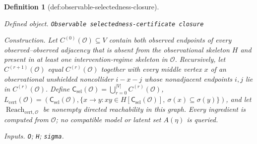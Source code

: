 \documentclass{article}
\newtheorem{definition}{Definition}
\begin{document}
\begin{definition}[def:observable-selectedness-closure]\label{def:observable-selectedness-closure}
\par\smallskip\noindent\emph{Defined object.} \texttt{Observable selectedness-\allowbreak{}certificate closure}
\par\smallskip\noindent\emph{Construction.} Let \(C^{(0)}(\mathcal O)\subseteq V\) contain both observed endpoints of every observed--observed adjacency that is absent from the observational skeleton \(H\) and present in at least one intervention-regime skeleton in \(\mathcal O\). Recursively, let \(C^{(r+1)}(\mathcal O)\) equal \(C^{(r)}(\mathcal O)\) together with every middle vertex \(x\) of an observational unshielded noncollider \(i-x-j\) whose nonadjacent endpoints \(i,j\) lie in \(C^{(r)}(\mathcal O)\). Define \(\mathsf C_{\mathrm{sel}}(\mathcal O)=\bigcup_{r=0}^{|V|}C^{(r)}(\mathcal O)\), \(L_{\mathrm{cert}}(\mathcal O)=(\mathsf C_{\mathrm{sel}}(\mathcal O),\{x\to y:xy\in H[\mathsf C_{\mathrm{sel}}(\mathcal O)],\ \sigma(x)\subseteq\sigma(y)\})\), and let \(\operatorname{Reach}_{\mathrm{cert},\mathcal O}\) be nonempty directed reachability in this graph. Every ingredient is computed from \(\mathcal O\); no compatible model or latent set \(A(\eta)\) is queried.
\par\smallskip\noindent\emph{Inputs.} \texttt{O}; \texttt{H}; \texttt{sigma}.
\end{definition}
\end{document}
